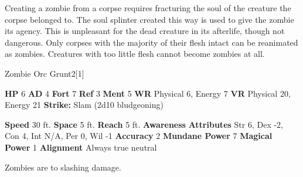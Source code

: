      Creating a zombie from a corpse requires fracturing the soul of the creature the corpse belonged to.
      The soul splinter created this way is used to give the zombie its agency.
      This is unpleasant for the dead creature in its afterlife, though not dangerous.
      Only corpses with the majority of their flesh intact can be reanimated as zombies.
      Creatures with too little flesh cannot become zombies at all.
    

      
  \begin{monsubsection}{Zombie Orc Grunt}{2}[1]
    \vspace{-1em}\vspace{-1em}
    \vspace{0em}

    
    

    \begin{spellcontent}
      \begin{spelltargetinginfo}
        \pari \textbf{HP} 6 \monsep
          \textbf{AD} 4 \monsep
          \textbf{Fort} 7 \monsep
          \textbf{Ref} 3 \monsep
          \textbf{Ment} 5
        \pari \textbf{WR} Physical 6, Energy 7 \monsep
        \textbf{VR} Physical 20, Energy 21
        \pari \textbf{Strike:}
            Slam  (2d10 bludgeoning)
      \end{spelltargetinginfo}
    \end{spellcontent}
    \begin{monsterfooter}
      \pari \textbf{Speed} 30 ft. \monsep
        \textbf{Space} 5 ft. \monsep
        \textbf{Reach} 5 ft.
      \pari \textbf{Awareness} 
      \pari \textbf{Attributes}
        Str 6, Dex -2,
        Con 4, Int N/A,
        Per 0, Wil -1
      \pari \textbf{Accuracy} 2 \monsep
        \textbf{Mundane Power} 7 \monsep
      \textbf{Magical Power} 1
      \pari \textbf{Alignment} Always true neutral
    \end{monsterfooter}
  \end{monsubsection}
          Zombies are  to slashing damage.
  

